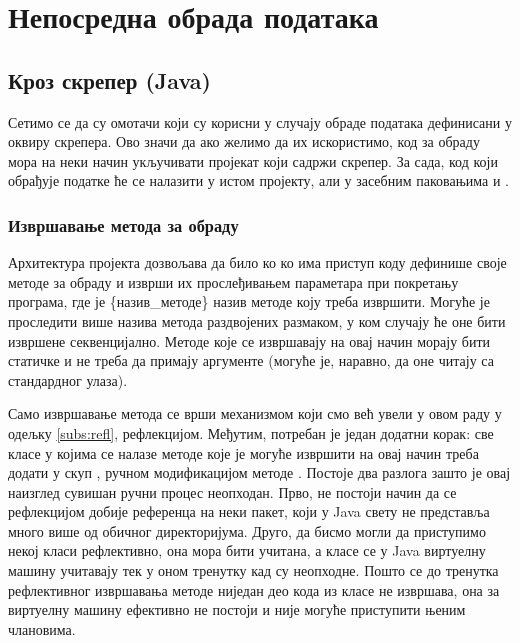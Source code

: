 \chapter{Непосредна обрада података}\label{ch:\thechapter}

\section{Кроз скрепер (Java)}

Сетимо се да су омотачи који су корисни у случају обраде података дефинисани у оквиру скрепера. Ово значи да ако желимо да их искористимо, код за обраду мора на неки начин укључивати пројекат који садржи скрепер. За сада, код који обрађује податке ће се налазити у истом пројекту, али у засебним паковањима  и .

\subsection{Извршавање метода за обраду}

Архитектура пројекта дозвољава да било ко ко има приступ коду дефинише своје методе за обраду и изврши их прослеђивањем параметара  при покретању програма, где је \{назив\_методе\} назив методе коју треба извршити. Могуће је проследити више назива метода раздвојених размаком, у ком случају ће оне бити извршене секвенцијално. Методе које се извршавају на овај начин морају бити статичке и не треба да примају аргументе (могуће је, наравно, да оне читају са стандардног улаза).

Само извршавање метода се врши механизмом који смо већ увели у овом раду у одељку \ref{subs:refl}, рефлекцијом. Међутим, потребан је један додатни корак: све класе у којима се налазе методе које је могуће извршити на овај начин треба додати у скуп , ручном модификацијом методе . Постоје два разлога зашто је овај наизглед сувишан ручни процес неопходан. Прво, не постоји начин да се рефлекцијом добије референца на неки пакет, који у Java свету не представља много више од обичног директоријума. Друго, да бисмо могли да приступимо некој класи рефлективно, она мора бити учитана, а класе се у Java виртуелну машину учитавају тек у оном тренутку кад су неопходне. Пошто се до тренутка рефлективног извршавања методе ниједан део кода из класе не извршава, она за виртуелну машину ефективно не постоји и није могуће приступити њеним члановима.

